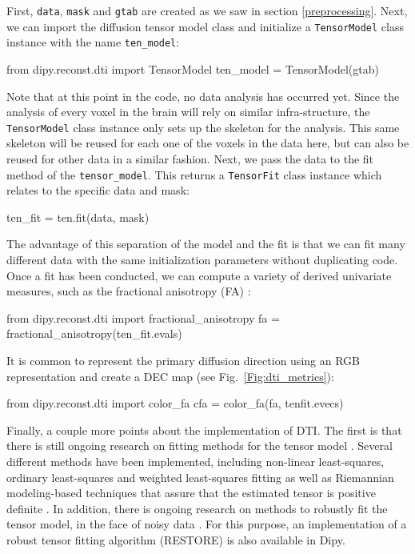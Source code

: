 \documentclass{bioinfo}
\begin{document}
First, \texttt{data}, \texttt{mask} and \texttt{gtab} are created as we saw in
section \ref{preprocessing}. Next, we can import the diffusion tensor model class
and initialize a \texttt{TensorModel} class instance with the name
\texttt{ten\_model}:
\begin{python}
from dipy.reconst.dti import TensorModel
ten_model = TensorModel(gtab)
\end{python}
Note that at this point in the code, no data analysis has occurred yet. Since
the analysis of every voxel in the brain will rely on similar infra-structure,
the \texttt{TensorModel} class instance only sets up the skeleton for the
analysis. This same skeleton will be reused for each one of the voxels in the
data here, but can also be reused for other data in a similar fashion.  Next,
we pass the data to the fit method of the \texttt{tensor\_model}. This returns
a \texttt{TensorFit} class instance which relates to the specific data and
mask:
\begin{python}
ten_fit = ten.fit(data, mask)
\end{python}
The advantage of this separation of the model and the fit is that we can fit
many different data with the same initialization parameters without duplicating
code. Once a fit has been conducted, we can compute a variety of derived
univariate measures, such as the fractional anisotropy (FA) \citep{Basser1996}:
\begin{python}
from dipy.reconst.dti import fractional_anisotropy
fa = fractional_anisotropy(ten_fit.evals)
\end{python}
It is common to represent the primary diffusion direction using an RGB
representation and create a DEC map \citep{pierpaoli-jezzard-etal:96}
(see Fig.~\ref{Fig:dti_metrics}):
\begin{python}
from dipy.reconst.dti import color_fa
cfa = color_fa(fa, tenfit.evecs)
\end{python}
Finally, a couple more points about the implementation of DTI. The first is that
there is still ongoing research on fitting methods for the tensor model
\citep{Koay2006}. Several different methods have been implemented, including
non-linear least-squares, ordinary least-squares and weighted least-squares
fitting \citep{chung-lu-etal:06} as well as Riemannian modeling-based
techniques that assure that the estimated tensor is positive definite
\citep{lenglet-rousson-etal:jmiv,arsigny-fillard-etal:06}. In
addition, there is ongoing research on
methods to robustly fit the tensor model, in the face of noisy data
\citep{Chang2005, Chang2012}. For this purpose, an implementation of a robust
tensor fitting algorithm (RESTORE) is also available in Dipy.
\end{document}
